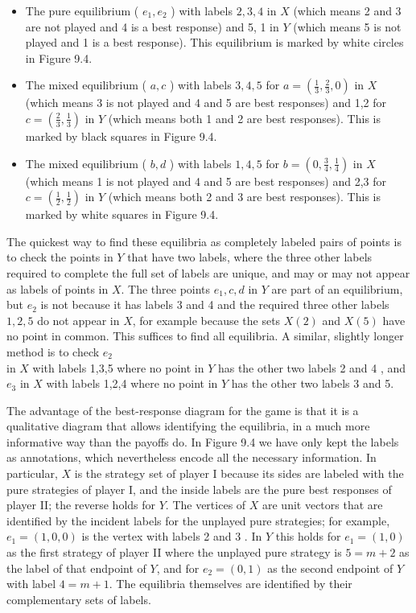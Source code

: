 \documentclass[12pt]{article}
\begin{document}
\begin{itemize}
  \item The pure equilibrium ( $e_{1}, e_{2}$ ) with labels $2,3,4$ in $X$ (which means 2 and 3 are not played and 4 is a best response) and 5, 1 in $Y$ (which means 5 is not played and 1 is a best response). This equilibrium is marked by white circles in Figure 9.4.
  \item The mixed equilibrium ( $a, c$ ) with labels $3,4,5$ for $a=\left(\frac{1}{3}, \frac{2}{3}, 0\right)$ in $X$ (which means 3 is not played and 4 and 5 are best responses) and 1,2 for $c=\left(\frac{2}{3}, \frac{1}{3}\right)$ in $Y$ (which means both 1 and 2 are best responses). This is marked by black squares in Figure 9.4.
  \item The mixed equilibrium ( $b, d$ ) with labels $1,4,5$ for $b=\left(0, \frac{3}{4}, \frac{1}{4}\right)$ in $X$ (which means 1 is not played and 4 and 5 are best responses) and 2,3 for $c=\left(\frac{1}{2}, \frac{1}{2}\right)$ in $Y$ (which means both 2 and 3 are best responses). This is marked by white squares in Figure 9.4.
\end{itemize}

The quickest way to find these equilibria as completely labeled pairs of points is to check the points in $Y$ that have two labels, where the three other labels required to complete the full set of labels are unique, and may or may not appear as labels of points in $X$. The three points $e_{1}, c, d$ in $Y$ are part of an equilibrium, but $e_{2}$ is not because it has labels 3 and 4 and the required three other labels $1,2,5$ do not appear in $X$, for example because the sets $X(2)$ and $X(5)$ have no point in common. This suffices to find all equilibria. A similar, slightly longer method is to check $e_{2}$\\
in $X$ with labels 1,3,5 where no point in $Y$ has the other two labels 2 and 4 , and $e_{3}$ in $X$ with labels 1,2,4 where no point in $Y$ has the other two labels 3 and 5.

The advantage of the best-response diagram for the game is that it is a qualitative diagram that allows identifying the equilibria, in a much more informative way than the payoffs do. In Figure 9.4 we have only kept the labels as annotations, which nevertheless encode all the necessary information. In particular, $X$ is the strategy set of player I because its sides are labeled with the pure strategies of player I, and the inside labels are the pure best responses of player II; the reverse holds for $Y$. The vertices of $X$ are unit vectors that are identified by the incident labels for the unplayed pure strategies; for example, $e_{1}=(1,0,0)$ is the vertex with labels 2 and 3 . In $Y$ this holds for $e_{1}=(1,0)$ as the first strategy of player II where the unplayed pure strategy is $5=m+2$ as the label of that endpoint of $Y$, and for $e_{2}=(0,1)$ as the second endpoint of $Y$ with label $4=m+1$. The equilibria themselves are identified by their complementary sets of labels.
\end{document}
